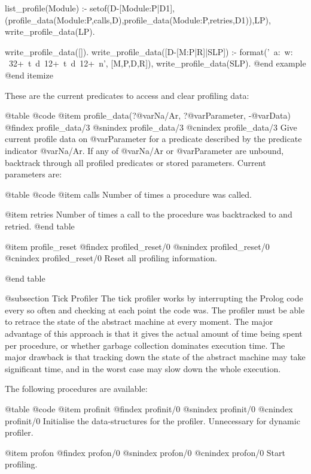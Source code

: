 {{{{{{list_profile(Module) :-
        setof(D-[Module:P|D1],(profile_data(Module:P,calls,D),profile_data(Module:P,retries,D1)),LP),
        write_profile_data(LP).

write_profile_data([]).
write_profile_data([D-[M:P|R]|SLP]) :-
        format('~a:~w: ~32+~t~d~12+~t~d~12+~n', [M,P,D,R]),
        write_profile_data(SLP).
@end example
@end itemize

These are  the current predicates to access and clear profiling data:

@table @code
@item profile_data(?@var{Na/Ar}, ?@var{Parameter}, -@var{Data})
@findex profile_data/3
@snindex profile_data/3
@cnindex profile_data/3
Give current profile data on @var{Parameter} for a predicate described
by the predicate indicator @var{Na/Ar}. If any of @var{Na/Ar} or
@var{Parameter} are unbound, backtrack through all profiled predicates
or stored parameters. Current parameters are:

@table @code
@item calls
Number of times a procedure was called.

@item retries
 Number of times a call to the procedure was backtracked to and retried.
@end table

@item profile_reset
@findex profiled_reset/0
@snindex profiled_reset/0
@cnindex profiled_reset/0
Reset all profiling information.

@end table

@subsection Tick Profiler
The tick profiler works by interrupting the Prolog code every so often
and checking at each point the code was. The profiler must be able to
retrace the state of the abstract machine at every moment. The major
advantage of this approach is that it gives the actual amount of time
being spent per procedure, or whether garbage collection dominates
execution time. The major drawback is that tracking down the state of
the abstract machine may take significant time, and in the worst case
may slow down the whole execution.

The following procedures are available:

@table @code
@item profinit
@findex profinit/0
@snindex profinit/0
@cnindex profinit/0
Initialise the data-structures for the profiler. Unnecessary for
dynamic profiler.

@item profon
@findex profon/0
@snindex profon/0
@cnindex profon/0
Start profiling.

}}}}}}
